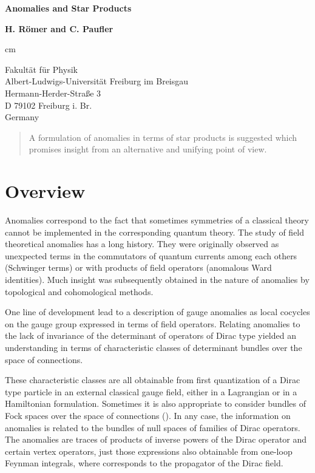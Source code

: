 \documentclass[a4paper,12pt]{article}
\begin{document}
 
\begin{center}
\vspace*{1.0cm}

{\LARGE{\bf Anomalies and Star Products}} 

\vskip 1.5cm

{\large {\bf H. R\"omer and C. Pauf\/ler}} 

 cm 

Fakult\"at f\"ur Physik\\ 
Albert-Ludwigs-Universit\"at Freiburg im Breisgau\\ 
Hermann-Herder-Stra\ss e 3\\ 
D 79102 Freiburg i. Br.\\
Germany


\end{center}

\vspace{1 cm}

\begin{abstract}
A formulation of anomalies in terms of star products is suggested which promises 
insight from an alternative and unifying point of view.
\end{abstract}

\vspace{1 cm} 

\section{Overview}

Anomalies correspond to the fact that sometimes symmetries of a classical
theory cannot be implemented in the corresponding quantum theory. The study of
field theoretical anomalies has a long history. They were originally observed as 
unexpected terms in the commutators of quantum currents among each others
(Schwinger terms) or with products of field operators (anomalous Ward
identities). Much insight was subsequently obtained in the nature of anomalies
by topological and cohomological methods.

One line of development lead to a description of gauge anomalies as local
cocycles on the gauge group expressed in terms of field operators. Relating
anomalies to the lack of invariance of the determinant of operators of Dirac
type yielded an understanding in terms of characteristic classes of determinant
bundles over the space of connections.

These characteristic classes are all obtainable from first quantization of a
Dirac type particle in an external classical gauge field, either in a
Lagrangian or in a Hamiltonian formulation. Sometimes it is also appropriate to
consider bundles of Fock spaces over the space of connections
(\cite{CaMiMu97b,Seg85}). 
In any case, the
information on anomalies is related to the bundles of null spaces of families of 
Dirac operators. The anomalies are traces of products of inverse powers of the
Dirac operator \coordHE{} and certain vertex operators, just those expressions also
obtainable from one-loop Feynman integrals, where \coordHE{} corresponds to the
propagator of the Dirac field.
\end{document}
